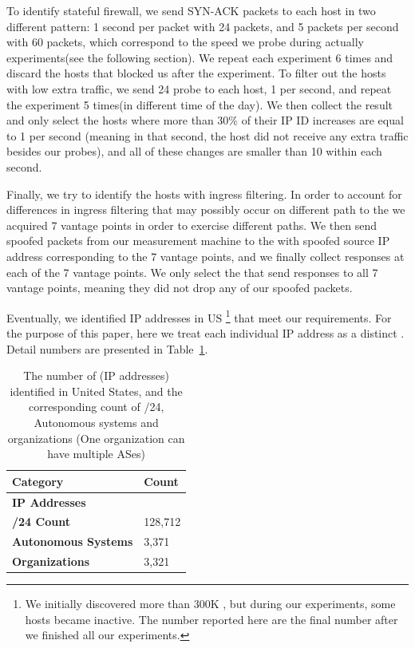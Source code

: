 To identify stateful firewall, we send SYN-ACK packets to each host in two
different pattern: 1 second per packet with 24 packets, and 5 packets per second
with 60 packets, which correspond to the speed we probe {} during
actually experiments(see the following section). We repeat each experiment 6
times and discard the hosts that blocked us after the experiment. To filter out
the hosts with low extra traffic, we send 24 probe to each host, 1 per second,
and repeat the experiment 5 times(in different time of the day). We then
collect the result and only select the hosts where more than 30\% of their IP
ID increases are equal to 1 per second (meaning in that second, the host did not
receive any extra traffic besides our probes), and all of these changes are
smaller than 10 within each second.

Finally, we try to identify the hosts with ingress filtering. In order to account
for differences in ingress filtering that may possibly occur on different path
to the {} we acquired 7 vantage points in order to exercise
different paths. We then send spoofed packets from our measurement
machine to the {} with spoofed source IP address corresponding to
the 7 vantage points, and we finally collect responses at each of the 7
vantage points. We only select the {} that send responses to all 7
vantage points, meaning they did not drop any of our spoofed packets.

Eventually, we identified {} IP addresses in US \footnote{We initially
discovered more than 300K {}, but during our experiments, some hosts
became inactive. The number reported here are the final number after we finished
all our experiments.} that meet our requirements.
For the purpose of this paper, here we treat each individual IP
address as a distinct {}. Detail numbers are presented in
Table~\ref{tab:target-hosts}.

\begin{table}
\centering
\caption{The number of {}(IP addresses) identified in United States, and the
corresponding count of /24, Autonomous systems and organizations (One
organization can have multiple ASes)}
\label{tab:target-hosts}
\footnotesize
\begin{tabular}{l >{\hfill}p{4.5cm}}
 \toprule
 Category                    &  Count    \\
 \midrule
 \textbf{IP Addresses}       &    \\
 \textbf{/24 Count}          &  128,712  \\
 \textbf{Autonomous Systems} &  3,371    \\
 \textbf{Organizations}      &  3,321    \\
 \bottomrule
\end{tabular}
\end{table}



